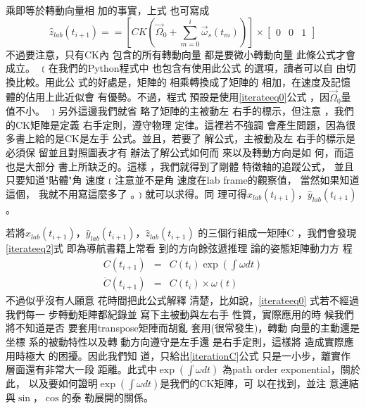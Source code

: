 \documentclass[12pt,twoside]{article}
\begin{document}
乘即等於轉動向量相%
加的事實\cite{goldstein}，上式%
也可寫成%
\begin{equation}
\hat{z}_{lab}\left( t_{i+1}\right) ==\left[ CK\left( \vec{\Omega}%
_{0}+\sum\limits_{m=0}^{i}\vec{\omega}_{s}\left( t_{m}\right) \right) \right]
\times \left[ 
\begin{array}{ccc}
0 & 0 & 1%
\end{array}%
\right]  \label{iterateeq2}
\end{equation}%
不過要注意，只有CK內%
包含的所有轉動向量%
都是要微小轉動向量%
此條公式才會成立。%
﹝在我們的Python程式中%
也包含有使用此公式%
的選項，讀者可以自%
由切換比較。用此公%
式的好處是，矩陣的%
相乘轉換成了矩陣的%
相加，在速度及記憶%
體的佔用上此近似會%
有優勢。不過，程式%
預設是使用\ref{iterateeq0}公式%
，因$\vec{\Omega}_{0}$量值不小。%
﹞另外這邊我們就省%
略了矩陣的主被動左%
右手的標示，但注意%
，我們的CK矩陣是定義%
右手定則，遵守物理%
定律。這裡若不強調%
會產生問題，因為很%
多書上給的是CK是左手%
公式。並且，若要了%
解公式，主被動及左%
右手的標示是必須保%
留並且對照圖表才有%
辦法了解公式如何而%
來以及轉動方向是如%
何，而這也是大部分%
書上所缺乏的。這樣%
，我們就得到了剛體%
特徵軸的追蹤公式，%
並且只要知道"貼體"角%
速度﹝注意並不是角%
速度在lab frame的觀察值，%
當然如果知道這個，%
我就不用寫這麼多了%
。﹞就可以求得。同%
理可得$\hat{x}_{lab}\left( t_{i+1}\right) $，$\hat{y}%
_{lab}\left( t_{i+1}\right) $。

若將$\hat{x}_{lab}\left( t_{i+1}\right) $，$\hat{y}%
_{lab}\left( t_{i+1}\right) $，$\hat{z}_{lab}\left( t_{i+1}\right) $%
的三個行組成一矩陣C%
，我們會發現\ref{iterateeq2}式%
即為導航書籍上常看%
到的方向餘弦遞推理%
論的姿態矩陣動力方%
程\cite{titterton}%
\begin{eqnarray}
C(t_{i+1}) &=&C(t_{i})\exp (\int \omega dt)  \label{iterationC} \\
\dot{C}(t_{i+1}) &=&C(t_{i})\times \omega (t)
\end{eqnarray}%
不過似乎沒有人願意%
花時間把此公式解釋%
清楚，比如說，\ref{iterateeq0}%
式若不經過我們每一%
步轉動矩陣都紀錄並%
寫下主被動與左右手%
性質，實際應用的時%
候我們將不知道是否%
要套用transpose矩陣而胡亂%
套用(很常發生)，轉動%
向量的主動還是坐標%
系的被動特性以及轉%
動方向遵守是左手還%
是右手定則，這樣將%
造成實際應用時極大%
的困擾。因此我們知%
道，只給出\ref{iterationC}公式%
只是一小步，離實作%
層面還有非常大一段%
距離。此式中$\exp (\int \omega dt)$%
為path order exponential，關於此，%
以及要如何證明$\exp (\int \omega
dt)$是我們的CK矩陣，可%
以在\cite[Page 49]{tong}找到，並注%
意連結與$\sin $，$\cos $的泰%
勒展開的關係。
\end{document}
